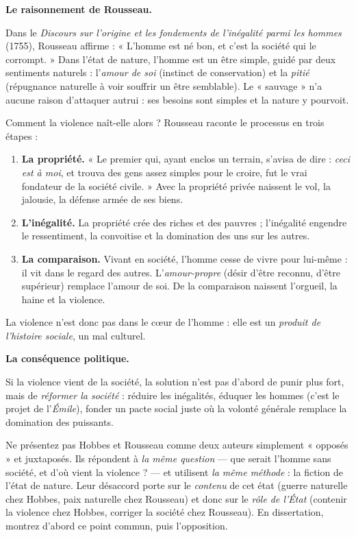 \documentclass[11pt]{article}
\newcommand{\cle}[1]{{\popxbold\color{popdark}#1}}
\begin{document}
\textbf{Le raisonnement de Rousseau.}\par
Dans le \emph{Discours sur l'origine et les fondements de l'inégalité parmi les hommes} (1755), Rousseau affirme : « L'homme est né bon, et c'est la société qui le corrompt. » Dans l'état de nature, l'homme est un être simple, guidé par deux sentiments naturels : l'\emph{amour de soi} (instinct de conservation) et la \emph{pitié} (répugnance naturelle à voir souffrir un être semblable). Le « sauvage » n'a aucune raison d'attaquer autrui : ses besoins sont simples et la nature y pourvoit.

Comment la violence naît-elle alors ? Rousseau raconte le processus en trois étapes :
\begin{enumerate}
\item \textbf{La propriété.} « Le premier qui, ayant enclos un terrain, s'avisa de dire : \emph{ceci est à moi}, et trouva des gens assez simples pour le croire, fut le vrai fondateur de la société civile. » Avec la propriété privée naissent le vol, la jalousie, la défense armée de ses biens.
\item \textbf{L'inégalité.} La propriété crée des riches et des pauvres ; l'inégalité engendre le ressentiment, la convoitise et la domination des uns sur les autres.
\item \textbf{La comparaison.} Vivant en société, l'homme cesse de vivre pour lui-même : il vit dans le regard des autres. L'\emph{amour-propre} (désir d'être reconnu, d'être supérieur) remplace l'amour de soi. De la comparaison naissent l'orgueil, la haine et la violence.
\end{enumerate}
La violence n'est donc pas dans le cœur de l'homme : elle est un \emph{produit de l'histoire sociale}, un mal \cle{culturel}.

\textbf{La conséquence politique.}\par
Si la violence vient de la société, la solution n'est pas d'abord de punir plus fort, mais de \emph{réformer la société} : réduire les inégalités, éduquer les hommes (c'est le projet de l'\emph{Émile}), fonder un pacte social juste où la volonté générale remplace la domination des puissants.

\begin{attention}
Ne présentez pas Hobbes et Rousseau comme deux auteurs simplement « opposés » et juxtaposés. Ils répondent à \emph{la même question} — que serait l'homme sans société, et d'où vient la violence ? — et utilisent \emph{la même méthode} : la fiction de l'état de nature. Leur désaccord porte sur le \emph{contenu} de cet état (guerre naturelle chez Hobbes, paix naturelle chez Rousseau) et donc sur le \emph{rôle de l'État} (contenir la violence chez Hobbes, corriger la société chez Rousseau). En dissertation, montrez d'abord ce point commun, puis l'opposition.
\end{attention}
\end{document}
